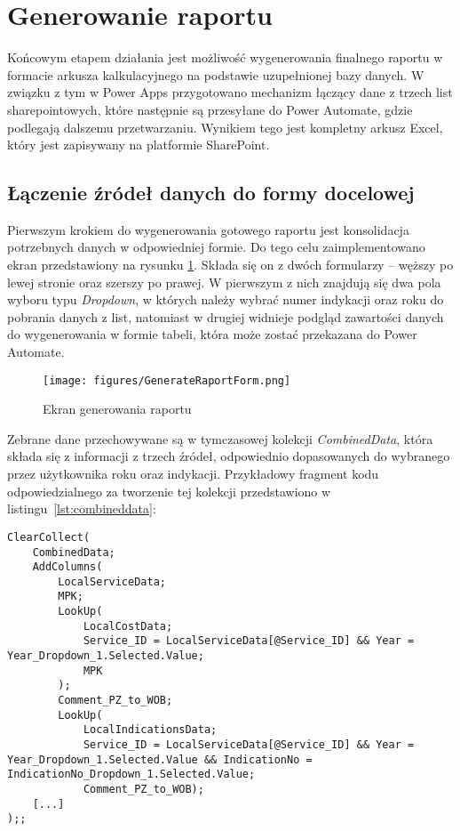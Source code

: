 \section{Generowanie raportu}

Końcowym etapem działania jest możliwość wygenerowania finalnego raportu w formacie arkusza kalkulacyjnego na podstawie uzupełnionej bazy danych. W związku z tym w Power Apps przygotowano mechanizm łączący dane z trzech list sharepointowych, które następnie są przesyłane do Power Automate, gdzie podlegają dalszemu przetwarzaniu. Wynikiem tego jest kompletny arkusz Excel, który jest zapisywany na platformie SharePoint.

\subsection{Łączenie źródeł danych do formy docelowej}

Pierwszym krokiem do wygenerowania gotowego raportu jest konsolidacja potrzebnych danych w odpowiedniej formie. Do tego celu zaimplementowano ekran przedstawiony na rysunku \ref{fig:generateraportform}. Składa się on z dwóch formularzy -- węższy po lewej stronie oraz szerszy po prawej. W pierwszym z nich znajdują się dwa
pola wyboru typu \emph{Dropdown}, w których należy wybrać numer indykacji oraz roku do pobrania danych z list, natomiast w drugiej widnieje podgląd zawartości danych do wygenerowania w formie tabeli, która może zostać przekazana do Power Automate.

\begin{figure}[H]
    \centering
    \texttt{[image: figures/GenerateRaportForm.png]}
    \caption{Ekran generowania raportu}
    \label{fig:generateraportform}
\end{figure}

Zebrane dane przechowywane są w tymczasowej kolekcji \textit{CombinedData}, która składa się z informacji z trzech źródeł, odpowiednio dopasowanych do wybranego przez użytkownika roku oraz indykacji. Przykładowy fragment kodu odpowiedzialnego za tworzenie tej kolekcji przedstawiono w listingu~\ref{lst:combineddata}:

\begin{lstlisting}[language=PowerFx, caption={Fragment kodu tworzącego kolekcję CombinedData}, label={lst:combineddata}] 
    ClearCollect(
    CombinedData;
    AddColumns(
        LocalServiceData;
        MPK;
        LookUp(
            LocalCostData;
            Service_ID = LocalServiceData[@Service_ID] && Year = Year_Dropdown_1.Selected.Value;
            MPK
        );
        Comment_PZ_to_WOB;
        LookUp(
            LocalIndicationsData;
            Service_ID = LocalServiceData[@Service_ID] && Year = Year_Dropdown_1.Selected.Value && IndicationNo = IndicationNo_Dropdown_1.Selected.Value;
            Comment_PZ_to_WOB);     
    [...]
);;

\end{lstlisting}

